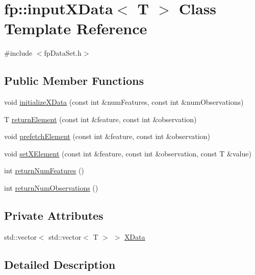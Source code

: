 \hypertarget{classfp_1_1inputXData}{}\section{fp\+:\+:input\+X\+Data$<$ T $>$ Class Template Reference}
\label{classfp_1_1inputXData}


{\ttfamily \#include $<$fp\+Data\+Set.\+h$>$}

\subsection*{Public Member Functions}
\begin{DoxyCompactItemize}
\item 
void \hyperlink{classfp_1_1inputXData_a2f49e8681655a35252b8c666a4ae826a}{initialize\+X\+Data} (const int \&num\+Features, const int \&num\+Observations)
\item 
T \hyperlink{classfp_1_1inputXData_a61344d139f038c857587e224620e48fe}{return\+Element} (const int \&feature, const int \&observation)
\item 
void \hyperlink{classfp_1_1inputXData_a2be81a23267dce73e72f8f9458427862}{prefetch\+Element} (const int \&feature, const int \&observation)
\item 
void \hyperlink{classfp_1_1inputXData_a91f24b99ba2cc2c9b518b17783e349a8}{set\+X\+Element} (const int \&feature, const int \&observation, const T \&value)
\item 
int \hyperlink{classfp_1_1inputXData_a8049555a9f1c77fbeba9f8ed63dca39f}{return\+Num\+Features} ()
\item 
int \hyperlink{classfp_1_1inputXData_a6608b9fdb8eddab4b391e7c3cc2b0f21}{return\+Num\+Observations} ()
\end{DoxyCompactItemize}
\subsection*{Private Attributes}
\begin{DoxyCompactItemize}
\item 
std\+::vector$<$ std\+::vector$<$ T $>$ $>$ \hyperlink{classfp_1_1inputXData_ad08f8c44df38fb88799cda53cc50eaa5}{X\+Data}
\end{DoxyCompactItemize}


\subsection{Detailed Description}
